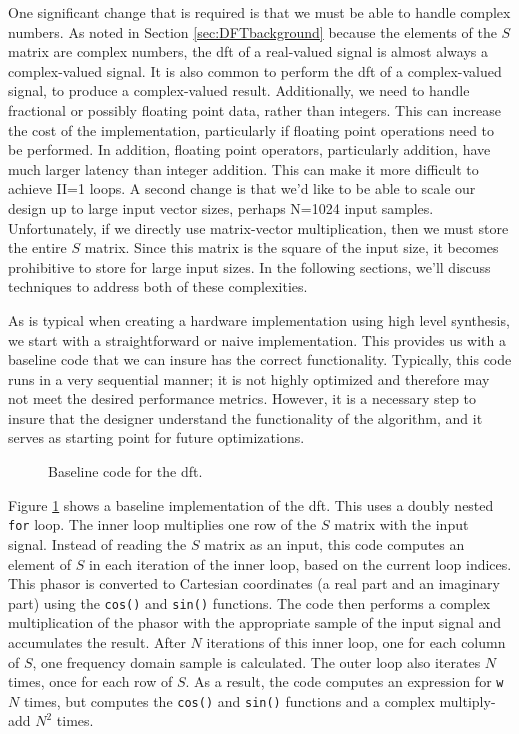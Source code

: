 One significant change that is required is that we must be able to handle complex numbers.  As noted in Section \ref{sec:DFTbackground} because the elements of the $S$ matrix are complex numbers, the \gls{dft} of a real-valued signal is almost always a complex-valued signal.   It is also common to perform the \gls{dft} of a complex-valued signal, to produce a complex-valued result.  Additionally, we need to handle fractional or possibly floating point data, rather than integers.  This can increase the cost of the implementation, particularly if floating point operations need to be performed.  In addition, floating point operators, particularly addition, have much larger latency than integer addition.  This can make it more difficult to achieve II=1 loops.  A second change is that we'd like to be able to scale our design up to large input vector sizes, perhaps N=1024 input samples.  Unfortunately, if we directly use matrix-vector multiplication, then we must store the entire $S$ matrix.  Since this matrix is the square of the input size, it becomes prohibitive to store for large input sizes.  In the following sections, we'll discuss techniques to address both of these complexities. 

As is typical when creating a hardware implementation using high level synthesis, we start with a straightforward or naive implementation. This provides us with a baseline code that we can insure has the correct functionality. Typically, this code runs in a very sequential manner; it is not highly optimized and therefore may not meet the desired performance metrics. However, it is a necessary step to insure that the designer understand the functionality of the algorithm, and it serves as starting point for future optimizations.

\begin{figure}

\caption{Baseline code for the \gls{dft}.}
\label{fig:dft_code}
\end{figure}

Figure \ref{fig:dft_code} shows a baseline implementation of the \gls{dft}. This uses a doubly nested \lstinline|for| loop. The inner loop multiplies one row of the $S$ matrix with the input signal. Instead of reading the $S$ matrix as an input, this code computes an element of $S$ in each iteration of the inner loop, based on the current loop indices.  This phasor is converted to Cartesian coordinates (a real part and an imaginary part) using the \lstinline|cos()| and \lstinline|sin()| functions. The code then performs a complex multiplication of the phasor with the appropriate sample of the input signal and accumulates the result. After $N$ iterations of this inner loop, one for each column of $S$, one frequency domain sample is calculated. The outer loop also iterates $N$ times, once for each row of $S$.  As a result, the code computes an expression for \lstinline|w| $N$ times, but computes the \lstinline|cos()| and \lstinline|sin()| functions and a complex multiply-add $N^2$ times.

